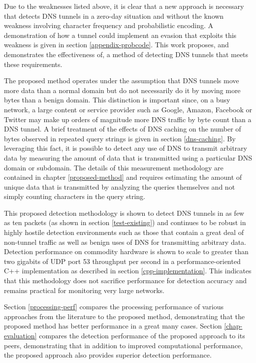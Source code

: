 \documentclass[12pt]{report}
\theoremstyle{remark}
\theoremstyle{definition}
\theoremstyle{definition}
\theoremstyle{definition}
\begin{document}
Due to the weaknesses listed above, it is clear that a new approach is necessary
that detects DNS tunnels in a zero-day situation and without the known weakness
involving character frequency and probabilistic encoding. A demonstration of how
a tunnel could implement an evasion that exploits this weakness is given in
section \ref{appendix-probcode}. This work proposes, and demonstrates the
effectiveness of, a method of detecting DNS tunnels that meets these
requirements.

The proposed method operates under the assumption that DNS tunnels move more
data than a normal domain but do not necessarily do it by moving more bytes than
a benign domain. This distinction is important since, on a busy network, a large
content or service provider such as Google, Amazon, Facebook or Twitter may make
up orders of magnitude more DNS traffic by byte count than a DNS tunnel. A brief
treatment of the effects of DNS caching on the number of bytes observed in
repeated query strings is given in section \ref{dns-caching}. By leveraging this
fact, it is possible to detect any use of DNS to transmit arbitrary data by
measuring the amount of data that is transmitted using a particular DNS domain
or subdomain. The details of this measurement methodology are contained in
chapter \ref{proposed-method} and requires estimating the amount of unique data
that is transmitted by analyzing the queries themselves and not simply counting
characters in the query string.

This proposed detection methodology is shown to detect DNS tunnels in as few as
ten packets (as shown in section \ref{test-existing}) and continues to be robust
in highly hostile detection environments such as those that contain a great deal
of non-tunnel traffic as well as benign uses of DNS for transmitting arbitrary
data. Detection performance on commodity hardware is shown to scale to greater
than two gigabits of UDP port 53 throughput per second in a performance-oriented
C++ implementation as described in section \ref{cpp-implementation}. This indicates
that this methodology does not sacrifice performance for detection accuracy and
remains practical for monitoring very large networks.

Section \ref{processing-perf} compares the processing performance of various
approaches from the literature to the proposed method, demonstrating that the
proposed method has better performance in a great many cases. Section
\ref{chap-evaluation} compares the detection performance of the proposed
approach to its peers, demonstrating that in addition to improved computational
performance, the proposed approach also provides superior detection performance.
\end{document}
